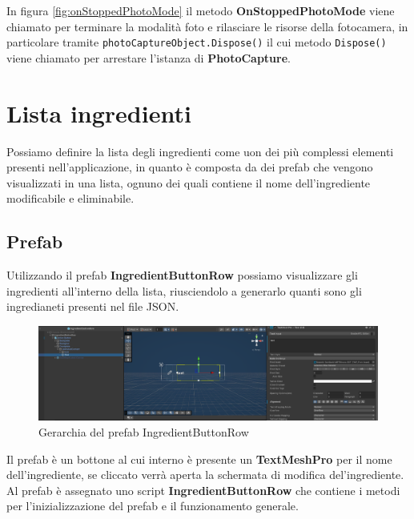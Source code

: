 In figura \ref{fig:onStoppedPhotoMode} il metodo \textbf{OnStoppedPhotoMode} viene chiamato per terminare la modalità foto e rilasciare le risorse della fotocamera, in particolare tramite \texttt{photoCaptureObject.Dispose()} il cui metodo \texttt{Dispose()} viene chiamato per arrestare l'istanza di \textbf{PhotoCapture}.

\section{Lista ingredienti}
Possiamo definire la lista degli ingredienti come uon dei più complessi elementi presenti nell'applicazione, in quanto è composta da dei prefab che vengono visualizzati in una lista, ognuno dei quali contiene il nome dell'ingrediente modificabile e eliminabile.
\subsection{Prefab}
Utilizzando il prefab \textbf{IngredientButtonRow} possiamo visualizzare gli ingredienti all'interno della lista, riusciendolo a generarlo quanti sono gli ingredianeti presenti nel file JSON.
\begin{figure}[H]
    \centering
    \includegraphics[width=1\textwidth,height=\textheight,keepaspectratio]{figures/chapter_1/prefab.png}
    \caption{Gerarchia del prefab IngredientButtonRow}
    \label{fig:prefab3D}
\end{figure}
Il prefab è un bottone al cui interno è presente un \textbf{TextMeshPro} per il nome dell'ingrediente, se cliccato verrà aperta la schermata di modifica del'ingrediente. 
Al prefab è assegnato uno script \textbf{IngredientButtonRow} che contiene i metodi per l'inizializzazione del prefab e il funzionamento generale.
